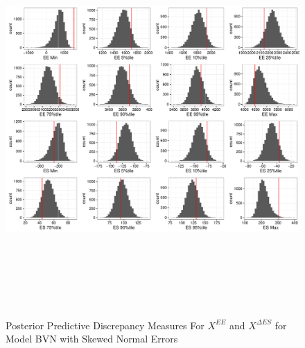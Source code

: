 \documentclass[11pt]{article}\usepackage[]{graphicx}\usepackage[]{color}
\begin{document}
 \begin{figure}
  \centering
  \includegraphics[width=17cm,height=15cm]{manual_figure/wpxdiagbvns.pdf}
  \caption{Posterior Predictive Discrepancy Measures For $X^{EE}$ and $X^{\Delta ES}$ for Model BVN with Skewed Normal Errors}
  \label{wpxdiagbvns}
  \end{figure}
\end{document}
